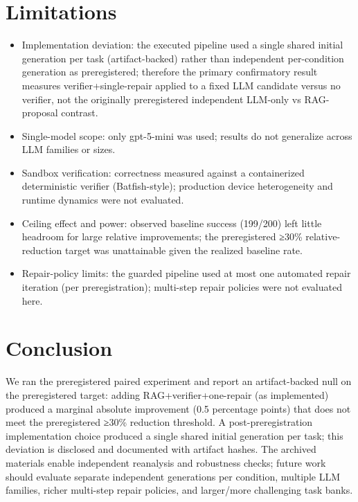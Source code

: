 \documentclass[conference]{IEEEtran}
\begin{document}
\section{Limitations}
\begin{itemize}
\item Implementation deviation: the executed pipeline used a single shared initial generation per task (artifact-backed) rather than independent per-condition generation as preregistered; therefore the primary confirmatory result measures verifier+single-repair applied to a fixed LLM candidate versus no verifier, not the originally preregistered independent LLM-only vs RAG-proposal contrast.
\item Single-model scope: only gpt-5-mini was used; results do not generalize across LLM families or sizes.
\item Sandbox verification: correctness measured against a containerized deterministic verifier (Batfish-style); production device heterogeneity and runtime dynamics were not evaluated.
\item Ceiling effect and power: observed baseline success (199/200) left little headroom for large relative improvements; the preregistered ≥30\% relative-reduction target was unattainable given the realized baseline rate.
\item Repair-policy limits: the guarded pipeline used at most one automated repair iteration (per preregistration); multi-step repair policies were not evaluated here.
\end{itemize}

\section{Conclusion}
We ran the preregistered paired experiment and report an artifact-backed null on the preregistered target: adding RAG+verifier+one-repair (as implemented) produced a marginal absolute improvement (0.5 percentage points) that does not meet the preregistered ≥30\% reduction threshold. A post-preregistration implementation choice produced a single shared initial generation per task; this deviation is disclosed and documented with artifact hashes. The archived materials enable independent reanalysis and robustness checks; future work should evaluate separate independent generations per condition, multiple LLM families, richer multi-step repair policies, and larger/more challenging task banks.
\end{document}
